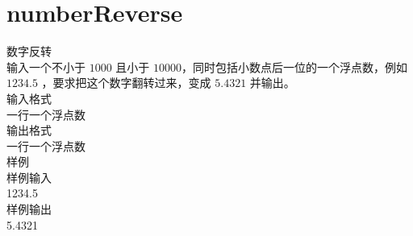 \documentclass[12pt,twiside,a4paper]{ctexbook}
\numberwithin{chapter}{part}
\begin{document}
\section{numberReverse}
数字反转\\
输入一个不小于 $1000$ 且小于 $10000$，同时包括小数点后一位的一个浮点数，例如 $1234.5$ ，要求把这个数字翻转过来，变成 $5.4321$ 并输出。\\
输入格式\\
一行一个浮点数\\
输出格式\\
一行一个浮点数\\
样例\\
样例输入\\
1234.5\\
样例输出\\
5.4321\\
\begin{lstlisting}[language=C++,breaklines=true]

\end{lstlisting}
\end{document}
